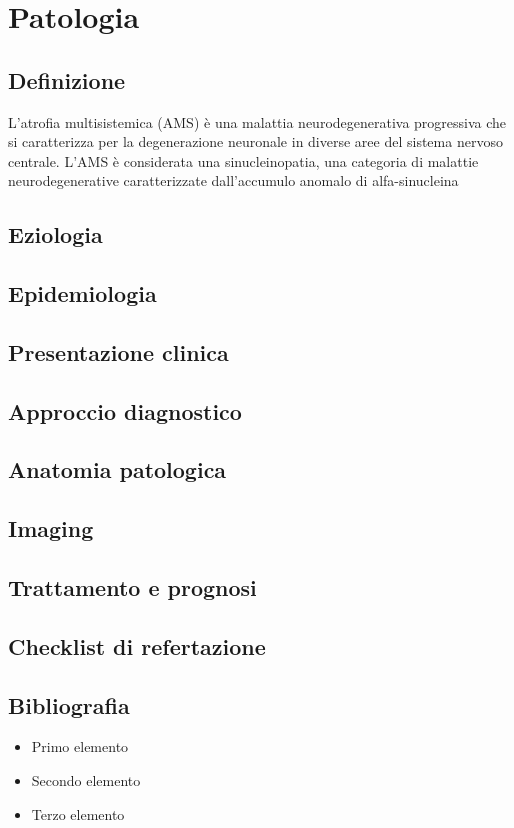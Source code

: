 \section{Patologia}

\subsection{Definizione}
L'atrofia multisistemica (AMS) è una malattia neurodegenerativa progressiva che si caratterizza per la degenerazione neuronale in diverse aree del sistema nervoso centrale. L'AMS è considerata una sinucleinopatia, una categoria di malattie neurodegenerative caratterizzate dall'accumulo anomalo di alfa-sinucleina

\subsection{Eziologia}

\subsection{Epidemiologia}

\subsection{Presentazione  clinica}

\subsection{Approccio diagnostico}

\subsection{Anatomia patologica}

\subsection{Imaging}

\subsection{Trattamento e prognosi}

\subsection{Checklist di refertazione}

\subsection{Bibliografia}
\small{
	
	
}


\begin{itemize}[label=$\square$] %
	\item Primo elemento
	\item Secondo elemento
	\item Terzo elemento
\end{itemize}